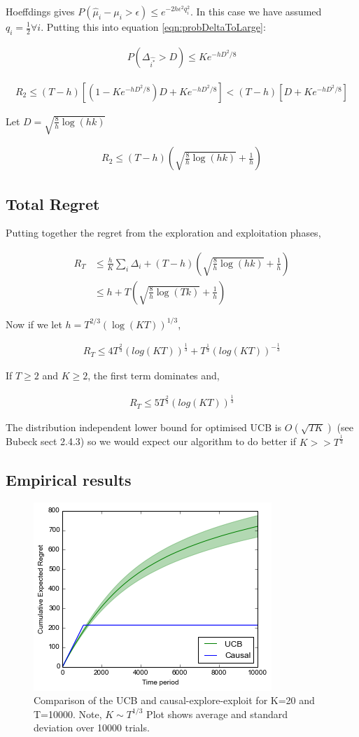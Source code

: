 \documentclass{article}
\newcommand{\eqn}[1]{\begin{align}#1\end{align}}
\theoremstyle{plain}
\theoremstyle{definition}
\begin{document}
Hoeffdings gives $ P(\hat{\mu}_i - \mu_{i} > \epsilon) \leq e^{-2h\epsilon^2q_i^2}$. In this case we have assumed $q_i = \frac{1}{2} \forall i$. Putting this into equation \ref{eqn:probDeltaToLarge}:

\eqn{
\label{eqn:balancedHoeffdings}
P(\Delta_{\hat{i^*}} > D) \leq Ke^{-hD^2/8}
}


\eqn{
R_2 \leq (T-h)[(1-K e^{-hD^2/8})D + K e^{-hD^2/8}] < (T-h)[D + K e^{-hD^2/8}]
}

Let $D = \sqrt{\frac{8}{h}\log(hk)}$ 

\eqn{
R_2 \leq (T-h)\left(\sqrt{\frac{8}{h}\log(hk)} + \frac{1}{h}\right)
}


\subsection*{Total Regret}

Putting together the regret from the exploration and exploitation phases,

\eqn{
R_T & \leq \frac{h}{K}\sum_i \Delta_i + (T-h)\left(\sqrt{\frac{8}{h}\log(hk)} + \frac{1}{h}\right)\\
& \leq h + T\left(\sqrt{\frac{8}{h}\log(Tk)} + \frac{1}{h}\right)
}

Now if we let $h = T^{2/3}(\log(KT))^{1/3}$,


\eqn {
R_T \leq 4T^{\frac{2}{3}}(log(KT))^{\frac{1}{3}} + T^{\frac{1}{3}}(log(KT))^{-\frac{1}{3}}
}

If $T \geq 2$ and $K \geq 2$, the first term dominates and,

\eqn {
R_T  \leq 5T^{\frac{2}{3}}(log(KT))^{\frac{1}{3}}
}

The distribution independent lower bound for optimised UCB is $O(\sqrt{TK})$ (see Bubeck sect 2.4.3) so we would expect our algorithm to do better if $K >> T^{\frac{1}{3}}$



\subsection*{Empirical results}
\begin{figure}[H]
\centering
\caption{Comparison of the UCB and causal-explore-exploit for K=20 and T=10000. Note, $K \sim T^{1/3}$ Plot shows average and standard deviation over 10000 trials.}
\includegraphics[width=.5\textwidth]{explore_exploit}
\end{figure}
\end{document}
